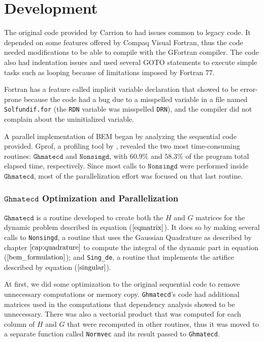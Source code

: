 \chapter{Development}

The original code provided by Carrion to had issues common to legacy code. 
It depended on some features offered by Compaq Visual Fortran, thus the code needed 
modifications to be able to compile with the GFortran compiler. The code also had 
indentation issues and used several GOTO statements to execute simple tasks such 
as looping because of limitations imposed by Fortran 77.

Fortran has a feature called implicit variable declaration that showed to be 
error-prone because the code had a bug due to a misspelled variable in a file 
named \texttt{Solfundif.for} (the \texttt{RDN} variable was misspelled \texttt{DRN}),
and the compiler did not complain about the uninitialized variable.

A parallel implementation of BEM began by analyzing the sequential code provided. 
Gprof, a profiling tool by \cite{binutils}, revealed the two most time-consuming routines: 
$\texttt{Ghmatecd}$ and $\texttt{Nonsingd}$, with $60.9\%$ and $58.3\%$ of the program total 
elapsed time, respectively.
Since most calls to $\texttt{Nonsingd}$ were performed inside $\texttt{Ghmatecd}$, most
of the parallelization effort was focused 
on that last routine.

\subsection{$\texttt{Ghmatecd}$ Optimization and Parallelization}

$\texttt{Ghmatecd}$ is a routine developed to create both the $H$ and $G$ matrices for the dynamic problem 
described in equation ($\ref{eqmatrix}$). It does so by making several calls to \texttt{Nonsingd}, a routine
that uses the Gaussian Quadrature as described by chapter $\ref{cap:quadrature}$ to compute the integral of the 
dynamic part in equation ($\ref{bem_formulation}$); and \texttt{Sing\_de}, a routine 
that implements the artifice described by equation ($\ref{singular}$).

At first, we did some optimization to the original sequential code to remove unnecessary computations or memory copy.
\texttt{Ghmatecd}'s code had additional matrices used in the computations that dependency analysis showed to be unnecessary. 
There was also a vectorial product that was computed for each column of $H$ and $G$ that were recomputed in other 
routines, thus it was moved to a separate function called \texttt{Normvec} and its result passed to \texttt{Ghmatecd}.

